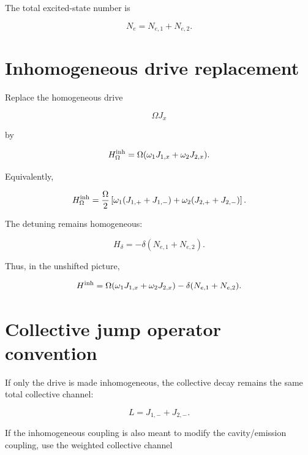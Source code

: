 \documentclass[11pt]{article}
\begin{document}
The total excited-state number is

\begin{equation}
N_e=N_{e,1}+N_{e,2}.
\end{equation}

\section*{Inhomogeneous drive replacement}

Replace the homogeneous drive

\begin{equation}
\Omega J_x
\end{equation}

by

\begin{equation}
H_{\Omega}^{\rm inh}
=
\Omega(\omega_1J_{1,x}+\omega_2J_{2,x}).
\end{equation}

Equivalently,

\begin{equation}
H_{\Omega}^{\rm inh}
=
\frac{\Omega}{2}
\left[
\omega_1(J_{1,+}+J_{1,-})
+
\omega_2(J_{2,+}+J_{2,-})
\right].
\end{equation}

The detuning remains homogeneous:

\begin{equation}
H_\delta=-\delta(N_{e,1}+N_{e,2}).
\end{equation}

Thus, in the unshifted picture,

\begin{equation}
H^{\rm inh}
=
\Omega(\omega_1J_{1,x}+\omega_2J_{2,x})
-
\delta(N_{e,1}+N_{e,2}).
\end{equation}

\section*{Collective jump operator convention}

If only the drive is made inhomogeneous, the collective decay remains the same
total collective channel:

\begin{equation}
L=J_{1,-}+J_{2,-}.
\end{equation}

If the inhomogeneous coupling is also meant to modify the cavity/emission
coupling, use the weighted collective channel
\end{document}
